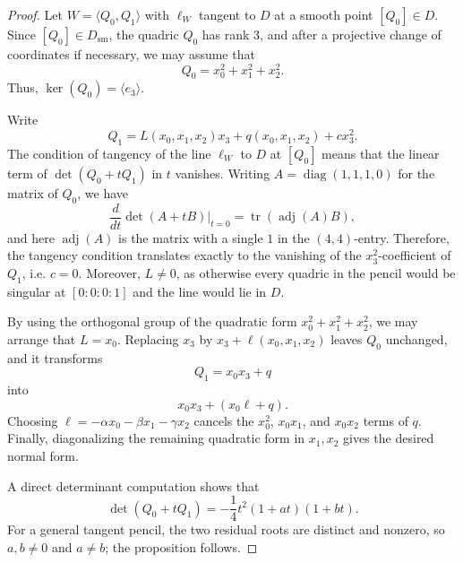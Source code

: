 \documentclass[10pt,a4paper]{amsart}
\begin{document}
\begin{proof}
Let $W=\langle Q_0,Q_1\rangle$ with $\ell_W$ tangent to $D$ at a smooth point $[Q_0]\in D$. Since $[Q_0]\in D_{\mathrm{sm}}$, the quadric $Q_0$ has rank $3$, and after a projective change of coordinates if necessary, we may assume that
\[
Q_0=x_0^2+x_1^2+x_2^2.
\]
Thus, $\ker(Q_0)=\langle e_3\rangle$.

Write
\[
Q_1=L(x_0,x_1,x_2)x_3 + q(x_0,x_1,x_2) + c x_3^2.
\]
The condition of tangency of the line $\ell_W$ to $D$ at $[Q_0]$ means that the linear term of
$\det(Q_0+tQ_1)$
in $t$ vanishes. Writing $A=\operatorname{diag}(1,1,1,0)$ for the matrix of $Q_0$, we have
\[
\frac{d}{dt}\det(A+tB)\big|_{t=0}=\operatorname{tr}(\operatorname{adj}(A)B),
\]
and here $\operatorname{adj}(A)$ is the matrix with a single $1$ in the $(4,4)$-entry. Therefore, the tangency condition translates exactly to the vanishing of the $x_3^2$-coefficient of $Q_1$, i.e. $c=0$. Moreover, $L\neq 0$, as otherwise every quadric in the pencil would be singular at $[0:0:0:1]$ and the line would lie in $D$.

By using the orthogonal group of the quadratic form $x_0^2+x_1^2+x_2^2$, we may arrange that $L=x_0$. Replacing $x_3$ by $x_3+\ell(x_0,x_1,x_2)$ leaves $Q_0$ unchanged, and it transforms
\[
Q_1=x_0x_3+q
\]
into
\[
x_0x_3+(x_0\ell+q).
\]
Choosing $\ell=-\alpha x_0-\beta x_1-\gamma x_2$ cancels the $x_0^2$, $x_0x_1$, and $x_0x_2$ terms of $q$. Finally, diagonalizing the remaining quadratic form in $x_1,x_2$ gives the desired normal form.

A direct determinant computation shows that
\[
\det(Q_0+tQ_1) = -\frac14 t^2(1+at)(1+bt).
\]
For a general tangent pencil, the two residual roots are distinct and nonzero, so $a,b\neq 0$ and $a\neq b$; the proposition follows.
\end{proof}
\end{document}
